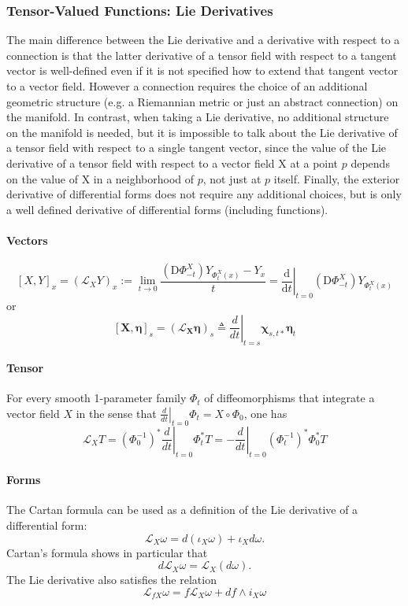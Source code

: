 \subsubsection{Tensor-Valued Functions: Lie Derivatives}

The main difference between the Lie derivative and a derivative with respect to a connection is that the latter derivative of a tensor field with respect to a tangent vector is well-defined even if it is not specified how to extend that tangent vector to a vector field. However a connection requires the choice of an additional geometric structure (e.g. a Riemannian metric or just an abstract connection) on the manifold. 
In contrast, when taking a Lie derivative, no additional structure on the manifold is needed, but it is impossible to talk about the Lie derivative of a tensor field with respect to a single tangent vector, since the value of the Lie derivative of a tensor field with respect to a vector field X at a point \(p\) depends on the value of X in a neighborhood of \(p\), not just at \(p\) itself. 
Finally, the exterior derivative of differential forms does not require any additional choices, but is only a well defined derivative of differential forms (including functions).

\paragraph{Vectors}
$$
[X, Y]_x=\left(\mathcal{L}_X Y\right)_x:=\lim _{t \rightarrow 0} \frac{\left(\mathrm{D} \Phi_{-t}^X\right) Y_{\Phi_t^X(x)}-Y_x}{t}=\left.\frac{\mathrm{d}}{\mathrm{d} t}\right|_{t=0}\left(\mathrm{D} \Phi_{-t}^X\right) Y_{\Phi_t^X(x)}
$$
or
$$
[\bm{X}, \bm{\eta}]_s=\left(\mathscr{L}_{\bm{X}} \bm{\eta}\right)_s\triangleq\left.\frac{d}{d t}\right|_{t=s} \bm{\chi}_{s, t *} \bm{\eta}_t
$$

\paragraph{Tensor}
For every smooth 1-parameter family $\Phi_t$ of diffeomorphisms that integrate a vector field $X$ in the sense that $\left.\frac{d}{d t}\right|_{t=0} \Phi_t=X \circ \Phi_0$, one has
$$
\mathcal{L}_X T=\left.\left(\Phi_0^{-1}\right)^* \frac{d}{d t}\right|_{t=0} \Phi_t^* T=-\left.\frac{d}{d t}\right|_{t=0}\left(\Phi_t^{-1}\right)^* \Phi_0^* T
$$

\paragraph{Forms}
The Cartan formula can be used as a definition of the Lie derivative of a differential form:
$$
\mathcal{L}_X \omega=d\left(\iota_X \omega\right)+\iota_X d \omega .
$$
Cartan's formula shows in particular that
$$
d \mathcal{L}_X \omega=\mathcal{L}_X(d \omega) .
$$
The Lie derivative also satisfies the relation
$$
\mathcal{L}_{f X} \omega=f \mathcal{L}_X \omega+d f \wedge i_X \omega
$$


